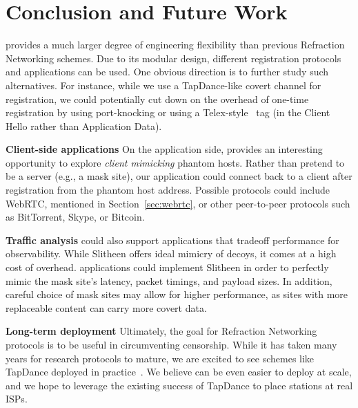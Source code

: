 \documentclass[sigconf,anonymous]{acmart}
\renewcommand{\paragraph}[1]{\smallskip\noindent\textbf{#1\quad}}
\begin{document}





\section{Conclusion and Future Work}

\scheme provides a much larger degree of engineering flexibility than previous
Refraction Networking schemes. Due to its modular design, different registration
protocols and applications can be used. One obvious direction is to further
study such alternatives. For instance, while we use a TapDance-like
covert channel for registration, we could potentially cut down on the overhead of one-time
registration by using port-knocking or using a Telex-style~\cite{telex11} tag (in the Client Hello rather than Application Data).

\paragraph{Client-side applications}
On the application side, \scheme provides an interesting opportunity to explore
\emph{client mimicking} phantom hosts. Rather than pretend to be a server (e.g.,
a mask site), our application could connect back to a client after registration
from the phantom host address. Possible protocols could include WebRTC, mentioned in
Section~\ref{sec:webrtc}, or other peer-to-peer protocols such as BitTorrent,
Skype, or Bitcoin.

\paragraph{Traffic analysis}
\scheme could also support applications that tradeoff performance for
observability. While Slitheen offers ideal mimicry of decoys, it comes at a high
cost of overhead. \scheme applications could implement Slitheen
in order to perfectly mimic the mask site's latency, packet timings, and payload
sizes. In addition, careful choice of mask sites may allow for higher
performance, as sites with more replaceable content can carry more covert data.

\paragraph{Long-term deployment}
Ultimately, the goal for Refraction Networking protocols is to be useful in
circumventing censorship. While it has taken many years for research
protocols to mature, we are excited to see schemes like TapDance deployed in
practice~\cite{frolov2017isp}. We believe \scheme can be even easier to deploy
at scale, and we hope to leverage the existing success of TapDance to place \scheme
stations at real ISPs.
\end{document}
